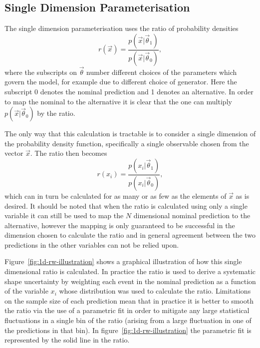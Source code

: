 \subsection{Single Dimension Parameterisation}
\label{sec:1D-reweight}

The single dimension parameterisation uses the ratio of probability densities
\begin{equation}
  r(\vec{x}) = \frac{p(\vec{x}|\vec{\theta}_{1})}{p(\vec{x}|\vec{\theta}_{0})},
  \label{eq:DensityRatio}
\end{equation}
where the subscripts on $\vec{\theta}$ number different choices of the
parameters which govern the model, for example due to different choice of
generator. Here the subscript 0 denotes the nominal prediction and 1 denotes an
alternative. In order to map the nominal to the alternative it is clear that the
one can multiply $p(\vec{x}|\vec{\theta}_{0})$ by the ratio.

The only way that this calculation is tractable is to consider a single
dimension of the probability density function, specifically a single observable
chosen from the vector $\vec{x}$. The ratio then becomes
\begin{equation}
  r(x_{i}) = \frac{p(x_{i}|\vec{\theta}_{1})}{p(x_{i}|\vec{\theta}_{0})},
  \label{eq:1D-ratio}
\end{equation}
which can in turn be calculated for as many or as few as the elements of
$\vec{x}$ as is desired. It should be noted that when the ratio is calculated
using only a single variable it can still be used to map the $N$ dimensional
nominal prediction to the alternative, however the mapping is only guaranteed to
be successful in the dimension chosen to calculate the ratio and in general
agreement between the two predictions in the other variables can not be relied
upon.

Figure~\ref{fig:1d-rw-illustration} shows a graphical illustration of how this
single dimensional ratio is calculated. In practice the ratio is used to derive
a systematic shape uncertainty by weighting each event in the nominal
prediction as a function of the variable $x_{i}$ whose distribution was used to
calculate the ratio. Limitations on the sample size of each prediction mean that
in practice it is better to smooth the ratio via the use of a parametric fit in
order to mitigate any large statistical fluctuations in a single bin of the
ratio (arising from a large fluctuation in one of the predictions in that bin).
In figure~\ref{fig:1d-rw-illustration} the parametric fit is represented by the
solid line in the ratio.


